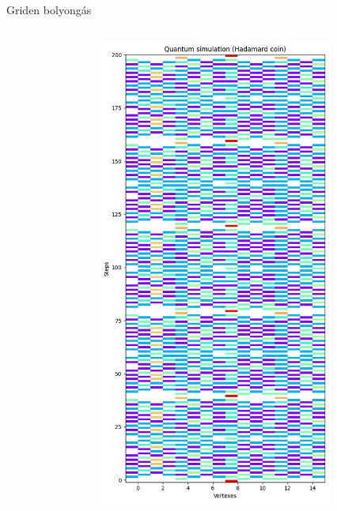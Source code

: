 \documentclass[aspectratio=169]{beamer}
\begin{document}
\begin{frame}{Griden bolyongás}
\begin{columns}[onlytextwidth]
\begin{column}{.25\textwidth}
\begin{figure}
      \end{figure}
    \end{column}
    \begin{column}{.25\textwidth}
      \begin{figure}
        \includegraphics[width=0.9\textwidth]{./tdk_figures/results/grid/hadamard.jpg}
      \end{figure}
    \end{column}
    \begin{column}{.25\textwidth}
    \end{column}
  \end{columns}
\end{frame}
\end{document}
